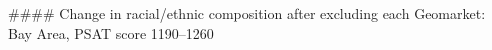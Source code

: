 #### Change in racial/ethnic composition after excluding each Geomarket: Bay Area, PSAT score 1190–1260
